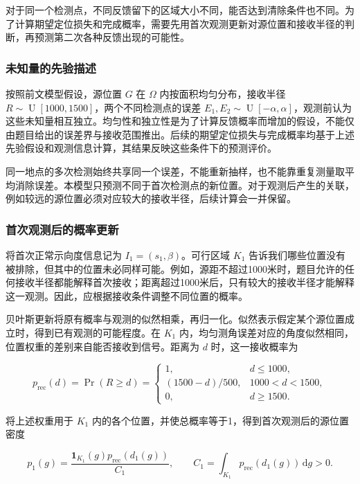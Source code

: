 \documentclass[UTF8,a4paper,zihao=-4,fontset=none]{ctexart}
\begin{document}
对于同一个检测点，不同反馈留下的区域大小不同，能否达到清除条件也不同。为了计算期望定位损失和完成概率，需要先用首次观测更新对源位置和接收半径的判断，再预测第二次各种反馈出现的可能性。

\subsubsection{未知量的先验描述}

按照前文模型假设，源位置 \(G\) 在 \(\Omega\) 内按面积均匀分布，接收半径 \(R\sim\operatorname{U}[1000,1500]\)，两个不同检测点的误差 \(E_1,E_2\sim\operatorname{U}[-\alpha,\alpha]\)，观测前认为这些未知量相互独立。均匀性和独立性是为了计算反馈概率而增加的假设，不能仅由题目给出的误差界与接收范围推出。后续的期望定位损失与完成概率均基于上述先验假设和观测信息计算，其结果反映这些条件下的预测评价。

同一地点的多次检测始终共享同一个误差，不能重新抽样，也不能靠重复测量取平均消除误差。本模型只预测不同于首次检测点的新位置。对于观测后产生的关联，例如较远的源位置必须对应较大的接收半径，后续计算会一并保留。

\subsubsection{首次观测后的概率更新}

将首次正常示向度信息记为 \(I_1=(s_1,\beta)\)。可行区域 \(K_1\) 告诉我们哪些位置没有被排除，但其中的位置未必同样可能。例如，源距不超过1000米时，题目允许的任何接收半径都能解释首次接收；距离超过1000米后，只有较大的接收半径才能解释这一观测。因此，应根据接收条件调整不同位置的概率。

贝叶斯更新将原有概率与观测的似然相乘，再归一化。似然表示假定某个源位置成立时，得到已有观测的可能程度。在 \(K_1\) 内，均匀测角误差对应的角度似然相同，位置权重的差别来自能否接收到信号。距离为 \(d\) 时，这一接收概率为

\begin{equation}
 p_{\mathrm{rec}}(d)=\Pr(R\ge d)=
 \begin{cases}
 1,&d\le1000,\\
 (1500-d)/500,&1000<d<1500,\\
 0,&d\ge1500.
 \end{cases}
\label{eq:q2-pair-weight}
\end{equation}

将上述权重用于 \(K_1\) 内的各个位置，并使总概率等于1，得到首次观测后的源位置密度

\begin{equation}
 p_1(g)=\frac{\mathbf1_{K_1}(g)p_{\mathrm{rec}}(d_1(g))}{C_1},
 \qquad C_1=\int_{K_1}p_{\mathrm{rec}}(d_1(g))\,\mathrm dg>0.
\label{eq:q2-pair-posterior}
\end{equation}
\end{document}
